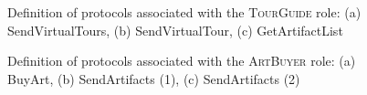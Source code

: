 \documentclass[paper=letter, fontsize=12pt]{article}
\begin{document}
\begin{figure}[H]
  \begin{center}
    \caption{Definition of protocols associated with the \textsc{TourGuide} role: (a) \fontfamily{\sfdefault}\selectfont SendVirtualTours, (b) SendVirtualTour, (c) GetArtifactList}
    \label{fig:tg_protocol}
  \end{center}
\end{figure}
\begin{figure}[H]
  \begin{center}
    \caption{Definition of protocols associated with the \textsc{ArtBuyer} role: (a) \fontfamily{\sfdefault}\selectfont BuyArt, (b) SendArtifacts (1), (c) SendArtifacts (2)}
    \label{fig:ab_protocol}
  \end{center}
\end{figure}
\end{document}
